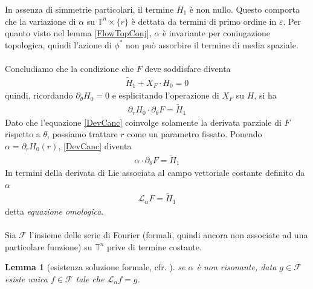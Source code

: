 \documentclass[twoside, 11pt]{amsbook}
\newcommand{\0}{{(0)}}
\newcommand{\3}{{(3)}}
\theoremstyle{colonplain}
\newtheorem{lemma}[thm]{Lemma}
\theoremstyle{colondefinition}
\theoremstyle{colonremark}
\numberwithin{equation}{chapter}
\begin{document}
In assenza di simmetrie particolari, il termine $\overline{H}_1$ è non nullo. Questo comporta che la variazione di $\alpha$ su $\mathbb{T}^n \times \{r\}$ è dettata da termini di primo ordine in $\varepsilon$. Per quanto visto nel lemma \ref{FlowTopConj}, $\alpha$ è invariante per coniugazione topologica, quindi l'azione di $\phi^*$ non può assorbire il termine di media spaziale. \\ \\
Concludiamo che la condizione che $F$ deve soddisfare diventa
\begin{align}\label{DevCanc}
    \tilde{H}_1 + X_F \cdot H_0 = 0 
\end{align}
quindi, ricordando $\partial_\theta H_0 = 0$ e esplicitando l'operazione di $X_F$ su $H$, si ha
\begin{align}
    \partial_rH_0 \cdot \partial_\theta F = \tilde{H}_1 
\end{align}
Dato che l'equazione \eqref{DevCanc} coinvolge solamente la derivata parziale di $F$ rispetto a $\theta$, possiamo trattare $r$ come un parametro fissato. Ponendo $\alpha = \partial_rH_0(r)$, \eqref{DevCanc} diventa
\begin{align}
    \alpha \cdot \partial_\theta F = \tilde{H}_1 
\end{align}
In termini della derivata di Lie associata al campo vettoriale costante definito da $\alpha$
\begin{align}\label{HomolEq}
    \mathcal{L}_\alpha F = \tilde{H}_1
\end{align}
detta \textit{equazione omologica}. \\ \\
Sia $\mathscr{F}$ l'insieme delle serie di Fourier (formali, quindi ancora non associate ad una particolare funzione) su $\mathbb{T}^n$ prive di termine costante.
\begin{lemma}[esistenza soluzione formale, cfr. \cite{Fejoz01}] se $\alpha$ è non risonante, data $g \in \mathscr{F}$ esiste unica $f \in \mathscr{F}$ tale che $\mathcal{L}_\alpha f = g$.
\end{lemma}
\end{document}
